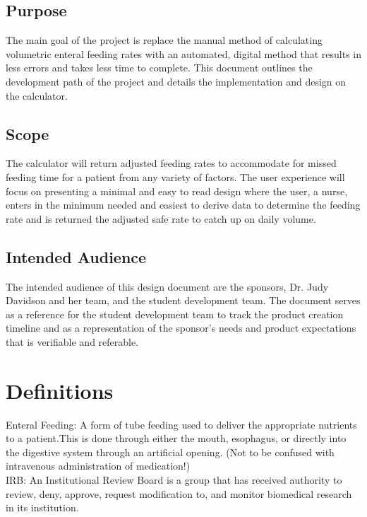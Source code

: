 \documentclass[onecolumn, draftclsnofoot,10pt, compsoc]{IEEEtran}
\begin{document}
\subsection{Purpose}
The main goal of the project is replace the manual method of calculating volumetric enteral feeding rates with an automated, digital method that results in less errors and takes less time to complete.
This document outlines the development path of the project and details the implementation and design on the calculator.
\subsection{Scope}
The calculator will return adjusted feeding rates to accommodate for missed feeding time for a patient from any variety of factors.
The user experience will focus on presenting a minimal and easy to read design where the user, a nurse, enters in the minimum needed and easiest to derive data to determine the feeding rate and is returned the adjusted safe rate to catch up on daily volume.
\subsection{Intended Audience}
The intended audience of this design document are the sponsors, Dr. Judy Davidson and her team, and the student development team.
The document serves as a reference for the student development team to track the product creation timeline and as a representation of the sponsor's needs and product expectations that is verifiable and referable.
\section{Definitions}
Enteral Feeding: A form of tube feeding used to deliver the appropriate nutrients to a patient.This is done through either the mouth, esophagus, or directly into the digestive system through an artificial opening. (Not to be confused with intravenous administration of medication!)\\
IRB:  An Institutional Review Board is a group that has received authority to review, deny, approve, request modification to, and monitor biomedical research in its institution.
\newline
\newline

\end{document}
